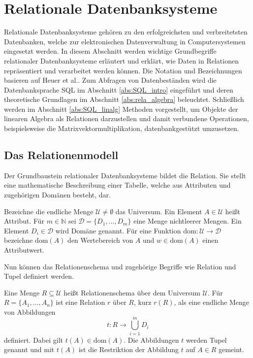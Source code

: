 \section{Relationale Datenbanksysteme}
\label{abs:relation_intro}
Relationale Datenbanksysteme gehören zu den erfolgreichsten und verbreitetsten Datenbanken, welche zur elektronischen Datenverwaltung in Computersystemen eingesetzt werden. In diesem Abschnitt werden wichtige Grundbegriffe relationaler Datenbanksysteme erläutert und erklärt, wie Daten in Relationen repräsentiert und verarbeitet werden können. Die Notation und Bezeichnungen basieren auf Heuer et al.\cite{DBLP:books/daglib/0044627}. Zum Abfragen von Datenbeständen wird die Datenbanksprache SQL im Abschnitt \ref{abs:SQL_intro} eingeführt und deren theoretische Grundlagen im Abschnitt \ref{abs:rela_algebra} beleuchtet. Schließlich werden im Abschnitt \ref{abs:SQL_linalg} Methoden vorgestellt, um Objekte der linearen Algebra als Relationen darzustellen und damit verbundene Operationen, beispielsweise die Matrixvektormultiplikation, datenbankgestützt umzusetzen.

\subsection{Das Relationenmodell}
Der Grundbaustein relationaler Datenbanksysteme bildet die Relation. Sie stellt eine mathematische Beschreibung einer Tabelle, welche aus Attributen und zugehörigen Domänen besteht, dar.

\begin{defi}
    \label{def:universum}
    Bezeichne die endliche Menge $\mathcal{U} \neq \emptyset$ das Universum. Ein Element $A \in \mathcal{U}$ heißt Attribut. Für $m \in \mathbb{N}$ sei $\mathcal{D}=\{D_1, \ldots, D_m\}$ eine Menge nichtleerer Mengen. Ein Element $D_i \in \mathcal{D}$ wird Domäne genannt. Für eine Funktion $\mathrm{dom}: \mathcal{U} \rightarrow \mathcal{D}$ bezeichne $\mathrm{dom}(A)$ den Wertebereich von $A$ und $w \in \mathrm{dom}(A)$ einen Attributwert.
\end{defi}

Nun können das Relationenschema und zugehörige Begriffe wie Relation und Tupel definiert werden.

\begin{defi}
    \label{def:relation}
    Eine Menge $R \subseteq \mathcal{U}$ heißt Relationenschema über dem Universum $\mathcal{U}$. Für $R=\{A_1, \ldots, A_n \}$ ist eine Relation $r$ über $R$, kurz $r(R)$, als eine endliche Menge von Abbildungen
    \begin{equation*}
        t:R \rightarrow \bigcup_{i=1}^m D_i
    \end{equation*}
    definiert. Dabei gilt $t(A) \in \mathrm{dom}(A)$. Die Abbildungen $t$ werden Tupel genannt und mit $t(A)$ ist die Restriktion der Abbildung $t$ auf $A \in R$ gemeint.
\end{defi}


